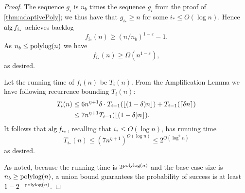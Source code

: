 \begin{proof}
{  The sequence $g_i$ is $n_b$ times the sequence $g_i$ from
  the proof of \cref{thm:adaptivePoly}; we thus have that $g_{i_*}
  \ge n$ for some $i_* \le O(\log n)$.
  Hence $\operatorname{\text{\textup{alg}}}{f_{i_*}}$ achieves backlog 
  $$f_{i_*}(n) \ge (n/n_b)^{1-\varepsilon}-1.$$
  As $n_b \le \operatorname{\text{polylog}}(n)$ we have
  $$f_{i_*}(n) \ge \Omega(n^{1-\varepsilon}),$$ as desired.

  Let the running time of $f_i(n)$ be $T_i(n)$. From the Amplification Lemma we have following recurrence bounding $T_i(n)$:
  \begin{align*}
    T_i(n) &\le 6n^{\eta+1} \delta \cdot T_{i-1}(\left\lfloor (1-\delta)n \right\rfloor) +
  T_{i-1}(\left\lceil \delta n \right\rceil) \\
  &\le 7n^{\eta+1}T_{i-1}(\left\lfloor (1-\delta)n \right\rfloor).
  \end{align*}
  It follows that $\operatorname{\text{\textup{alg}}}{f_{i_*}}$, recalling that $i_* \le O(\log n)$, has running time
  $$T_{i_*}(n) \le (7n^{\eta+1})^{O(\log n)} \le 2^{O(\log^2 n)}$$
  as desired.

  As noted, because the running time is $2^{\operatorname{\text{polylog}}(n)}$ and the
  base case size is $n_b\ge \operatorname{\text{polylog}}(n)$, a union bound
  guarantees the probability of success is at least
  $1-2^{-\operatorname{\text{polylog}}(n)}$.
}
\end{proof}


